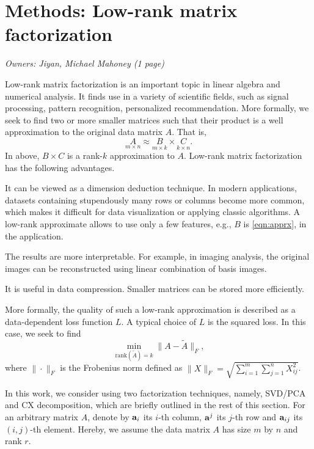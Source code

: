\section{Methods: Low-rank matrix factorization}
\label{sxn:low-rank-methods}
\textit{Owners: Jiyan, Michael Mahoney (1 page)}

Low-rank matrix factorization is an important topic in linear algebra and numerical analysis.
It finds use in a variety of scientific fields, such as signal processing, pattern recognition, personalized recommendation.
More formally, we seek to find two or more smaller matrices such that their product is a well approximation to the original data matrix $A$.
That is,
\begin{equation}
 \label{eqn:apprx}
    \underset{m\times n}{A} \approx \underset{m\times k}{B} \times \underset{k\times n}{C}.
\end{equation}
In above, $B \times C$ is a rank-$k$ approximation to $A$.
Low-rank matrix factorization has the following advantages.
\begin{compactitem}
\item
It can be viewed as a dimension deduction technique.
In modern applications, datasets containing stupendously many rows or columns become more common, which makes it difficult for data visualization or applying classic algorithms. A low-rank approximate allows to use only a few features, e.g., $B$ is \eqref{eqn:apprx}, in the application.
\item
The results are more interpretable.
For example, in imaging analysis, the original images can be reconstructed using linear combination of basis images.
\item
It is useful in data compression.
Smaller matrices can be stored more efficiently.
\end{compactitem}

More formally, the quality of such a low-rank approximation is described as a data-dependent loss function $L$. A typical choice of $L$ is the squared loss. In this case, we seek to find
\begin{equation}
 \label{eqn:obj}
  \min_{\text{rank}(\tilde A) = k} \| A - \tilde A \|_F,
\end{equation}
where $\| \cdot \|_F$ is the Frobenius norm defined as $\|X\|_F = \sqrt{ \sum_{i=1}^m \sum_{j=1}^n X_{ij}^2 }$.

In this work, we consider using two factorization techniques, namely, SVD/PCA and CX decomposition, which are briefly outlined in the rest of this section. For an arbitrary matrix $A$, denote by $\mathbf{a}_i$ its $i$-th column, $\mathbf{a}^j$ its $j$-th row and $\mathbf{a}_{ij}$ its $(i,j)$-th element. Hereby, we assume the data matrix $A$ has size $m$ by $n$ and rank $r$.

